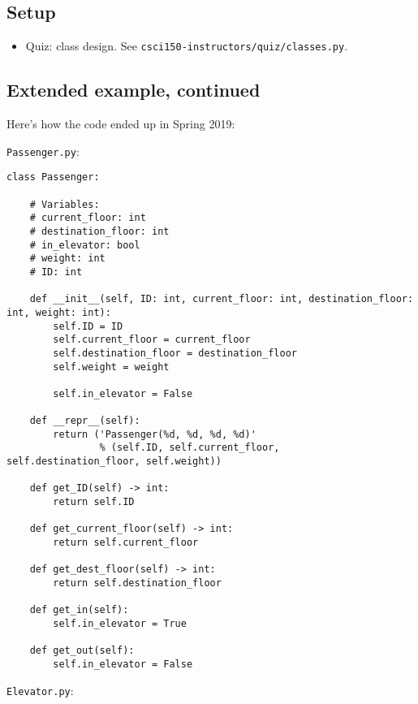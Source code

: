 \documentclass{article}
\newcommand{\notready}{\textcolor{red}{\XSolidBold}\xspace}
\begin{document}
\subsection*{Setup}

\begin{itemize}
\item \notready Quiz: class design.  See \texttt{csci150-instructors/quiz/classes.py}.
\end{itemize}

\subsection*{Extended example, continued}

Here's how the code ended up in Spring 2019:

\newpage
\noindent \texttt{Passenger.py}:

\begin{verbatim}
class Passenger:

    # Variables:
    # current_floor: int
    # destination_floor: int
    # in_elevator: bool
    # weight: int
    # ID: int

    def __init__(self, ID: int, current_floor: int, destination_floor: int, weight: int):
        self.ID = ID
        self.current_floor = current_floor
        self.destination_floor = destination_floor
        self.weight = weight

        self.in_elevator = False

    def __repr__(self):
        return ('Passenger(%d, %d, %d, %d)'
                % (self.ID, self.current_floor, self.destination_floor, self.weight))

    def get_ID(self) -> int:
        return self.ID

    def get_current_floor(self) -> int:
        return self.current_floor

    def get_dest_floor(self) -> int:
        return self.destination_floor

    def get_in(self):
        self.in_elevator = True

    def get_out(self):
        self.in_elevator = False
\end{verbatim}

\newpage
\noindent \texttt{Elevator.py}:
\end{document}
